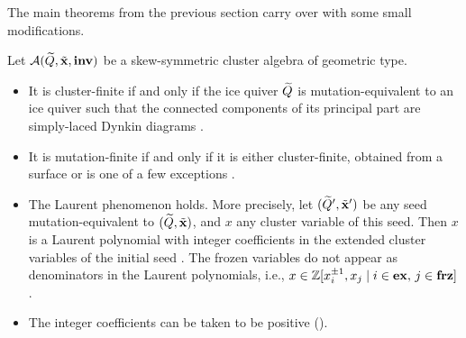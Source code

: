 The main theorems from the previous section carry over with some small modifications.
\begin{theorem}

	Let $\mathcal{A}(\widetilde{Q}, \tilde{\mathbf{x}}, \mathbf{inv})$ be a skew-symmetric cluster algebra of geometric type.
	\begin{itemize}
		\item It is cluster-finite if and only if the ice quiver $\widetilde{Q}$ is mutation-equivalent to an
		      ice quiver such that the connected components of its principal part are simply-laced
		      Dynkin diagrams \cite{FominZelevinsky2003CAFin}.
		\item It is mutation-finite if and only if it is either cluster-finite, obtained from a
		      surface or is one of a few exceptions \cite{FeliksonPavel2023cluster}.
		\item The Laurent phenomenon holds. More precisely, let $(\widetilde{Q}', \tilde{\mathbf{x}}')$ be any seed
		      mutation-equivalent to $(\widetilde{Q}, \tilde{\mathbf{x}})$, and $x$ any cluster variable of this seed. Then
		      $x$ is a Laurent polynomial with integer coefficients in the extended cluster variables
		      of the initial seed \cite{FominZelevinsky2002CAF}. The frozen variables do not appear
		      as denominators in the Laurent polynomials, i.e., $x \in \mathbb{Z}[x_i^{\pm 1}, x_j \mid i
			      \in \mathbf{ex},\, j \in \mathbf{frz}]$ \cite[Theorem 3.3.6]{FominWilliams2021IntroductionCA_1-3}.
		\item The integer coefficients can be taken to be positive
		      (\cite{LeeSchiffler2015PositivityCA}).
	\end{itemize}
\end{theorem}

